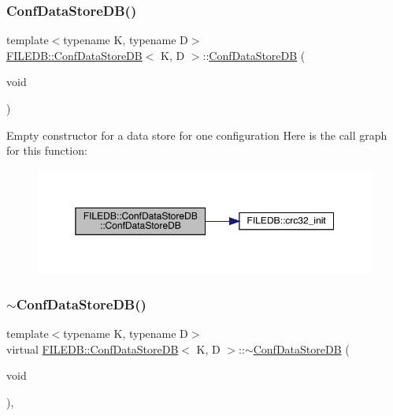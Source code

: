\subsubsection{\texorpdfstring{ConfDataStoreDB()}{ConfDataStoreDB()}\hspace{0.1cm}{\footnotesize\ttfamily [1/3]}}
{\footnotesize\ttfamily template$<$typename K, typename D$>$ \\
\mbox{\hyperlink{classFILEDB_1_1ConfDataStoreDB}{F\+I\+L\+E\+D\+B\+::\+Conf\+Data\+Store\+DB}}$<$ K, D $>$\+::\mbox{\hyperlink{classFILEDB_1_1ConfDataStoreDB}{Conf\+Data\+Store\+DB}} (\begin{DoxyParamCaption}\item[{void}]{ }\end{DoxyParamCaption})\hspace{0.3cm}{\ttfamily [inline]}}

Empty constructor for a data store for one configuration Here is the call graph for this function\+:
\nopagebreak
\begin{figure}[H]
\begin{center}
\leavevmode
\includegraphics[width=350pt]{d8/d19/classFILEDB_1_1ConfDataStoreDB_a575d901daeccae08bcda5b2a60681e1b_cgraph}
\end{center}
\end{figure}
\mbox{\label{classFILEDB_1_1ConfDataStoreDB_a39b48750dbc9bd0d4ca8c9787edee897}} 
\subsubsection{\texorpdfstring{$\sim$ConfDataStoreDB()}{~ConfDataStoreDB()}\hspace{0.1cm}{\footnotesize\ttfamily [1/3]}}
{\footnotesize\ttfamily template$<$typename K, typename D$>$ \\
virtual \mbox{\hyperlink{classFILEDB_1_1ConfDataStoreDB}{F\+I\+L\+E\+D\+B\+::\+Conf\+Data\+Store\+DB}}$<$ K, D $>$\+::$\sim$\mbox{\hyperlink{classFILEDB_1_1ConfDataStoreDB}{Conf\+Data\+Store\+DB}} (\begin{DoxyParamCaption}\item[{void}]{ }\end{DoxyParamCaption})\hspace{0.3cm}{\ttfamily [inline]}, {\ttfamily [virtual]}}

